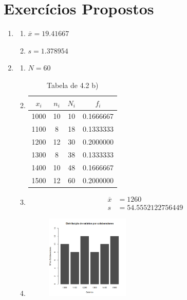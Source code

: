 \documentclass[11pt,a4paper]{report}
\begin{document}
\section*{Exercícios Propostos}

\begin{enumerate}[label=\arabic{chapter}.\arabic*]
	\item {}
		\begin{enumerate}[label=\alph*)]
		\item $\overline{x} = 19.41667$\hfill
			
		\item $s = 1.378954$\hfill
			
		\end{enumerate}
	\item {}\hfill
		\begin{enumerate}[label=\alph*)]
		\item $N = 60$\hfill
			
		\item \hfill
			\begin{table}[h!]
				\centering
				\begin{tabular}{|c|c|c|c|}
					\hline
					$x_i$&$n_i$&$N_i$&$f_i$ \\
					\hline
					1000&10&10&0.1666667\\
					\hline
					1100& 8&18&0.1333333\\
					\hline
					1200&12&30&0.2000000\\
					\hline
					1300& 8&38&0.1333333\\
					\hline
					1400&10&48&0.1666667\\
					\hline
					1500&12&60&0.2000000\\
					\hline
				\end{tabular}
				\caption{Tabela de 4.2 b)}
			\end{table}
			
			\clearpage
		\item \hfill
			\begin{align*}
				\overline{x} &= 1260 \\
				s &= 54.5552122756449
			\end{align*}
			
		\item \hfill
			\begin{figure}[h!]
				\centering
				\includegraphics[width=0.4\textwidth]{./recursos/ex4_2d.png}

\end{figure}
\end{enumerate}
\end{enumerate}
\end{document}

